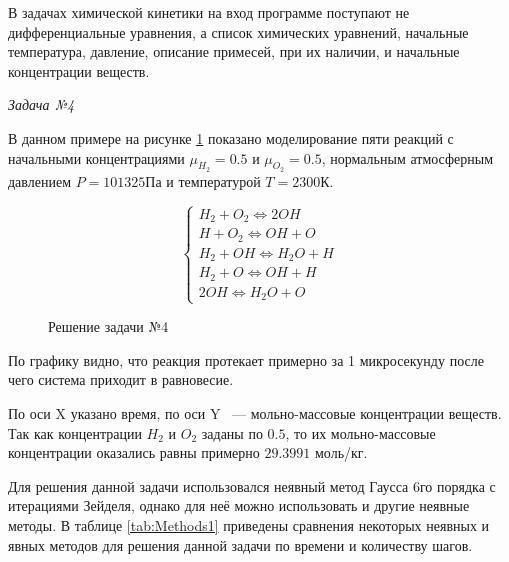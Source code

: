 В задачах химической кинетики на вход программе поступают не дифференциальные уравнения, а список химических уравнений, начальные
температура, давление, описание примесей, при их наличии, и начальные концентрации веществ.

\textit{Задача №4}

В данном примере на рисунке \ref{fig:chem1} показано моделирование пяти реакций с начальными концентрациями $\mu_{H_2} = 0.5$ и $\mu_{O_2} = 0.5$, нормальным
атмосферным давлением $P = 101325\text{Па}$ и температурой $T = 2300\text{К}$.

\begin{equation}
    \begin{cases}
        H_2 + O_2 \Longleftrightarrow 2OH\\
        H + O_2 \Longleftrightarrow OH + O\\
        H_2 + OH \Longleftrightarrow H_2O + H\\
        H_2 + O \Longleftrightarrow OH + H\\
        2OH \Longleftrightarrow H_2O + O
    \end{cases}
\label{eq:ChemTask1}
\end{equation}

\begin{figure}
    
    \caption{Решение задачи №4}
    \label{fig:chem1}
\end{figure}

По графику видно, что реакция протекает примерно за 1 микросекунду после чего система приходит в равновесие.

По оси X указано время, по оси Y ~--- мольно-массовые концентрации веществ. Так как концентрации $H_2$ и $O_2$ заданы по $0.5$, то их
мольно-массовые концентрации оказались равны примерно $29.3991$ моль/кг.

Для решения данной задачи использовался неявный метод Гаусса 6го порядка с итерациями Зейделя, однако для неё можно использовать и
другие неявные методы. В таблице \ref{tab:Methods1} приведены сравнения некоторых неявных и явных методов для решения данной задачи по
времени и количеству шагов.

